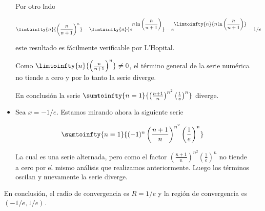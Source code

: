 \begin{ejem}
\begin{itemize}
        Por otro lado
        
        \[
        \limtoinfty{n}{\left(\frac{n}{n+1}\right)^n} = \limtoinfty{n}{e^{\displaystyle n\ln\left(\frac{n}{n+1}\right)}} = e^{\displaystyle \limtoinfty{n}{n\ln\left(\frac{n}{n+1}\right)}} = 1/e
        \]
        
        \noindent este resultado es fácilmente verificable por L'Hopital.
        
        Como $\limtoinfty{n}{\left(\frac{n}{n+1}\right)^n} \neq 0$, el término general de la serie numérica no tiende a cero y por lo tanto la serie diverge.
        
        En conclusión la serie $\sumtoinfty{n=1}{\left(\frac{n+1}{n}\right)^{n^2}\left(\frac{1}{e}\right)^n}$ diverge.
        
        \item Sea $x = -1/e$. Estamos mirando ahora la siguiente serie
        
        \[
        \sumtoinfty{n=1}{(-1)^n\left(\frac{n+1}{n}\right)^{n^2}\left(\frac{1}{e}\right)^n}
        \]
        
        La cual es una serie alternada, pero como el factor $\left(\frac{n+1}{n}\right)^{n^2}\left(\frac{1}{e}\right)^n$ no tiende a cero por el mismo análisis que realizamos anteriormente. Luego los términos oscilan y nuevamente la serie diverge.
    \end{itemize}
    
    En conclusión, el radio de convergencia es $R=1/e$ y la región de convergencia es $(-1/e, 1/e)$.
\end{ejem}